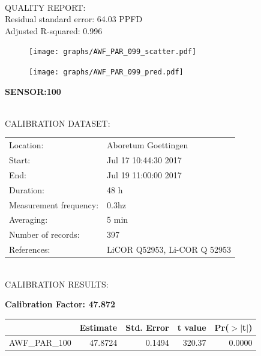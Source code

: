\documentclass[oneside]{report}
\begin{document}
\hrulefill\\
QUALITY REPORT:\\
Residual standard error: 64.03 PPFD\\
Adjusted R-squared: 0.996



\begin{figure}[H]
  \centering
  \texttt{[image: graphs/AWF\_PAR\_099\_scatter.pdf]}
\end{figure}




\begin{figure}[H]
  \centering
  \texttt{[image: graphs/AWF\_PAR\_099\_pred.pdf]}
\end{figure}

\pagebreak


\begin{center}
\large{\textbf{SENSOR:100}}\\
\end{center}

\hrulefill\\
CALIBRATION DATASET:\\
\begin{table}[h!]
  \centering
  \label{tab:table1}
  \begin{tabular}{ll}
    Location: & Aboretum Goettingen\\ 
    
    
    Start:  & Jul 17 10:44:30 2017 \\
    End:   & Jul 19 11:00:00 2017\\ 
    Duration: & 48 h\\
    Measurement frequency: & 0.3hz\\
    Averaging:  &5 min\\
    Number of records: & 397 \\
    References: & LiCOR Q52953, Li-COR Q 52953 \\
  \end{tabular}
\end{table}

\hrulefill\\
CALIBRATION RESULTS:\\


\begin{center}
\textbf{\large{Calibration Factor: 47.872}}\\
\end{center}
\begin{table}[ht]
\centering
\begin{tabular}{rrrrr}
  \hline
 & Estimate & Std. Error & t value & Pr($>$$|$t$|$) \\ 
  \hline
AWF\_PAR\_100 & 47.8724 & 0.1494 & 320.37 & 0.0000 \\ 
   \hline
\end{tabular}
\end{table}
\end{document}
